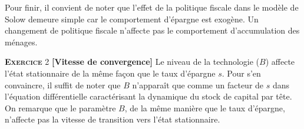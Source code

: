 \documentclass[10pt,a4paper,notitlepage,onecolumn]{article}
\newcommand{\exercice}[2]{\textsc{\textbf{Exercice}} #1 \textbf{[#2]}}
\begin{document}
Pour finir, il convient de noter que l'effet de la
politique fiscale dans le modèle de Solow demeure simple car le
comportement d'épargne est exogène. Un changement de politique
fiscale n'affecte pas le comportement d'accumulation des ménages.\newline

\bigskip


\exercice{2}{Vitesse de convergence} Le niveau de la technologie ($B$)
affecte l'état  stationnaire de  la même façon  que le  taux d'épargne
$s$.  Pour s'en convaincre, il suffit  de noter que $B$ n'apparaît que
comme un  facteur de $s$ dans  l'équation différentielle caractérisant
la  dynamique du  stock  de  capital par  tête.   On  remarque que  le
paramètre $B$, de la même manière que le taux d'épargne, n'affecte pas
la vitesse de transition vers l'état stationnaire.\newline
\end{document}

